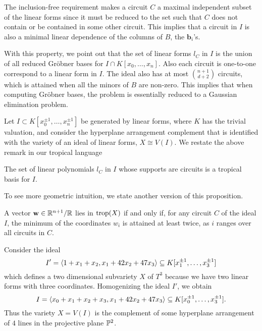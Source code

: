 	\begin{remark}
		The inclusion-free requirement makes a circuit $C$ 
		a maximal independent subset of the linear forms
		since it must be reduced to the set 
		such that $C$ does not contain or be contained 
		in some other circuit. 
		This implies that a circuit in $I$ is also 
		a minimal linear dependence 
		of the columns of $B$, the $\mathbf{b}_i$'s. 
		
		
		With this property, 
		we point out that the set of linear forms $l_C$ in $I$ 
		is the union of all reduced Gr\"{o}bner bases for $I \cap K[x_0, \ldots, x_n]$.
		Also each circuit is one-to-one correspond to a linear form 
		in $I$. 
		The ideal also has at most $\binom{n+1}{d+2}$ circuits, 
	 	which is attained when all the minors of $B$ are non-zero. 
		This implies that when computing Gr\"{o}bner bases,
		the problem is essentially reduced to 
		a Gaussian elimination problem. 
	\end{remark}
	
	Let $I \subset K[x_0^{\pm 1}, \ldots, x_n^{\pm 1}]$ 
	be generated by linear forms,
	where $K$ has the trivial valuation,
	and consider the hyperplane arrangement complement 
	that is identified with the variety of an ideal of linear forms, 
	$X \cong V(I)$.
	We restate the above remark in our tropical language
	
	\begin{proposition}
		The set of linear polynomials $l_C$ in $I$
		whose supports are circuits is a tropical basis for $I$.
	\end{proposition}
	
	To see more geometric intuition, we state another version of 
	this proposition.
	\begin{proposition}
		A vector $\mathbf{w} \in \R^{n+1}/\R$ lies in $\trop(X)$ 
		if and only if, for any circuit $C$ of the ideal $I$,
		the minimum of the coordinates $w_i$ is attained at least twice,
		as $i$ ranges over all circuits in $C$.
	\end{proposition}
	
	\begin{example}
		Consider the ideal 
		\[
		I' = \inner{1 + x_1 + x_2, x_1 + 42x_2 + 47 x_3}
		\subseteq K[x_1^{\pm 1}, \ldots, x_3^{\pm 1}]
		\]
		which defines a two dimensional subvariety $X$ 
		of $T^3$ because we have two linear forms
		with three coordinates.
		Homogenizing the ideal $I'$,
		we obtain 
		\[
		I = \inner{x_0 + x_1 + x_2 + x_3, x_1 + 42x_2 + 47 x_3}
		\subseteq K[x_0^{\pm 1}, \ldots, x_3^{\pm 1}].
		\]
		Thus the variety $X = V(I)$ is the complement of 
		some hyperplane arrangement of $4$ lines in the projective plane $\P^2$. 
	\end{example}
	
